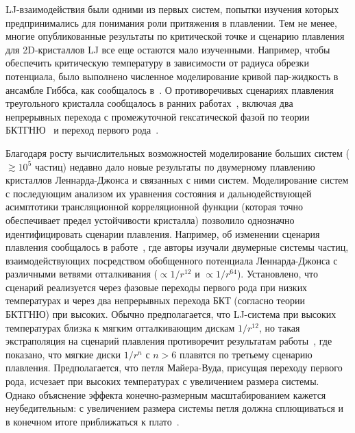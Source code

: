 LJ-взаимодействия были одними из первых систем, попытки изучения которых предпринимались для понимания роли притяжения в плавлении. Тем не менее, многие опубликованные результаты по критической точке и сценарию плавления для 2D-кристаллов LJ все еще остаются мало изученными. Например, чтобы обеспечить критическую температуру в зависимости от радиуса обрезки потенциала, было выполнено численное моделирование кривой пар-жидкость в ансамбле Гиббса, как сообщалось в~\cite{10.1063/1.460477}.
О противоречивых сценариях плавления треугольного кристалла сообщалось в ранних работах~\cite{10.1103/physrevlett.42.1632, 10.1063/1.436526, 10.1103/physrevlett.44.463, 10.1063/1.441901, 10.1103/physrevlett.52.449, 10.1103/physrevb.30.2755}, включая два непрерывных перехода с промежуточной гексатической фазой по теории БКТГНЮ~\cite{10.1103/physrevlett.42.1632} и переход первого рода~\cite{10.1063/1.436526, 10.1103/physrevlett.44.463, 10.1063/1.441901, 10.1103/physrevlett.52.449}.

Благодаря росту вычислительных возможностей моделирование больших систем ($\gtrsim 10^5$ частиц) недавно дало новые результаты по двумерному плавлению кристаллов Леннарда-Джонса и связанных с ними систем. Моделирование систем с последующим анализом их уравнения состояния и дальнодействующей асимптотики трансляционной корреляционной функции (которая точно обеспечивает предел устойчивости кристалла) позволило однозначно идентифицировать сценарии плавления. Например, об изменении сценария плавления сообщалось в работе~\cite{10.1103/physreve.99.022145}, где авторы изучали двумерные системы частиц, взаимодействующих посредством обобщенного потенциала Леннарда-Джонса с различными ветвями отталкивания ($\propto 1/r ^{12}$ и $\propto 1/r^{64}$). Установлено, что сценарий реализуется через фазовые переходы первого рода при низких температурах и через два непрерывных перехода БКТ (согласно теории БКТГНЮ) при высоких. Обычно предполагается, что LJ-система при высоких температурах близка к мягким отталкивающим дискам $1/r^{12}$, но такая экстраполяция на сценарий плавления противоречит результатам работы~\cite{10.1103/physrevlett.114.035702}, где показано, что мягкие диски $1/r^n$ с $n>6$ плавятся по третьему сценарию плавления. Предполагается, что петля Майера-Вуда, присущая переходу первого рода, исчезает при высоких температурах с увеличением размера системы. Однако объяснение эффекта конечно-размерным масштабированием кажется неубедительным: с увеличением размера системы петля должна сплющиваться и в конечном итоге приближаться к плато~\cite{10.1103/physreve.87.042134, 10.1103/physreve.59.2659}.

